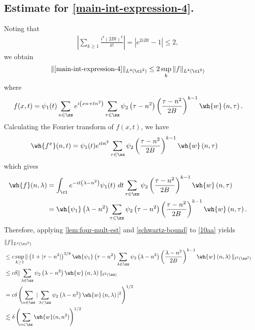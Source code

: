 \subsection{Estimate for \eqref{main-int-expression-4}.}
Noting that
%
%
\begin{equation*}
	\begin{split}
		|\sum_{k \ge 1} \frac{i^k (2Bt)^k}{k!}| = |e^{2iBt} - 1| \le 2,
	\end{split}
\end{equation*}
%
%
we obtain
%
%
\begin{equation}
	\label{10aa}
	\begin{split}
		\|\eqref{main-int-expression-4}\|_{L^4(\ci^2)} 
		\le 2 \sup_k \|f \|_{L^4(\ci^2)}
	\end{split}
\end{equation}
%
%
where $$f(x,t) = \psi_1(t) \sum_{n \in \zz} e^{i\left( xn + tn^2 \right)} 
		\sum_{\tau \in \zz} \psi_2\left( \tau - n^2 
		\right)\left (\frac{ \tau - n^2}{2B}\right)^{k - 1} \wh{w}\left( n, \tau 
		\right).$$
%
%
Calculating the Fourier transform of $f(x, t)$, we have
\begin{equation*}
	\begin{split}
		& \wh{f^x}(n, t) = \psi_1(t) e^{itn^2} \sum_{\tau \in \zz} 
		\psi_2\left (\frac{ \tau - n^2}{2B}\right)^{k - 1}
		\wh{w}\left( n, \tau \right)
	\end{split}
\end{equation*}
which gives
\begin{equation*}
	\begin{split}
		\wh{f}(n, \lambda)
		& = \int_\ci e^{-it\left( \lambda - n^2 \right)} 
		\psi_1(t) \ dt \sum_{\tau \in \zz} \psi_2
		\left (\frac{ \tau - n^2}{2B}\right)^{k - 1}
\wh{w}\left( n, \tau 
		\right)
		\\
		&  = \wh{\psi_1}\left( \lambda - n^2 \right) \sum_{\tau \in \zz} 
		\psi_2\left( \tau - n^2 \right)
		\left (\frac{ \tau - n^2}{2B}\right)^{k - 1}
		\wh{w} \left(n, \tau \right).
	\end{split}
\end{equation*}
%
%
Therefore, applying \cref{lem:four-mult-est} and 
\eqref{schwartz-bound} to \eqref{10aa} yields
%
%
\begin{equation}
	\label{main-int-4-est-prelim}
	\begin{split}
		& \|f\|_{L^4(\ci^2)} 
		\\
		& \le c \sup_{k \ge 1} \|\left( 1 + |\tau - n^2| 
		\right)^{3/8} \wh{\psi_1}\left( \tau - n^2 \right) \sum_{\lambda 
		\in \zz} \psi_2\left( \lambda - n^2 \right)\left( \frac{\lambda - 
		n^2}{2B} 
		\right)^{k - 1} \wh{w}\left( n, \lambda \right) \|_{\ell^2(\zz^2)}
		\\
		& \le c \delta \| \sum_{\lambda \in \zz} 
		\psi_2\left( \lambda - n^2 \right) \wh{w}\left( n, \lambda \right)\|_{\ell^2(\zz)}
		\\
		& = c \delta \left( \sum_{n \in \zz} | 
		\sum_{\lambda \in \zz} \psi_2\left( \lambda - n^2 \right) 
		\wh{w}\left( n, \lambda \right)|^2\right)^{1/2}
		\\
		& \lesssim \delta \left( \sum_{n \in \zz} \wh{w}(n, 
		n^2) \right)^{1/2}
	\end{split}
\end{equation}
